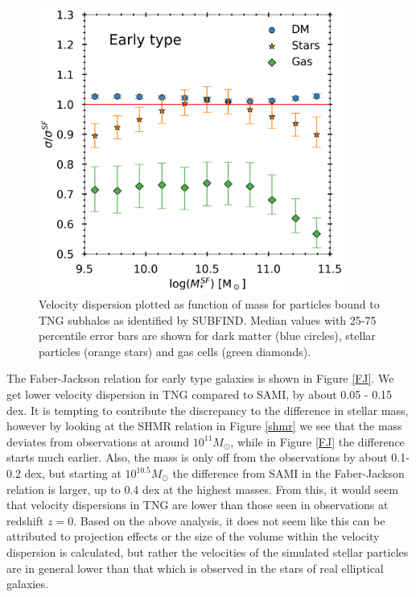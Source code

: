 \begin{figure}
    \centering
    \includegraphics[width=0.9\textwidth]{images/VD_particles.png}
    \caption{Velocity dispersion plotted as function of mass for particles bound to TNG subhalos as identified by SUBFIND. Median values with 25-75 percentile error bars are shown for dark matter (blue circles), stellar particles (orange stars) and gas cells (green diamonds).}
    \label{VD_part}
\end{figure}

The Faber-Jackson relation for early type galaxies is shown in Figure \ref{FJ}. We get lower velocity dispersion in TNG compared to SAMI, by about 0.05 - 0.15 dex. It is tempting to contribute the discrepancy to the difference in stellar mass, however by looking at the SHMR relation in Figure \ref{shmr} we see that the mass deviates from observations at around $10^{11} M_{\odot}$, while in Figure \ref{FJ} the difference starts much earlier. Also, the mass is only off from the observations by about 0.1-0.2 dex, but starting at $10^{10.5} M_{\odot}$ the difference from SAMI in the Faber-Jackson relation is larger, up to 0.4 dex at the highest masses. From this, it would seem that velocity dispersions in TNG are lower than those seen in observations at redshift $z=0$. Based on the above analysis, it does not seem like this can be attributed to projection effects or the size of the volume within the velocity dispersion is calculated, but rather the velocities of the simulated stellar particles are in general lower than that which is observed in the stars of real elliptical galaxies.

